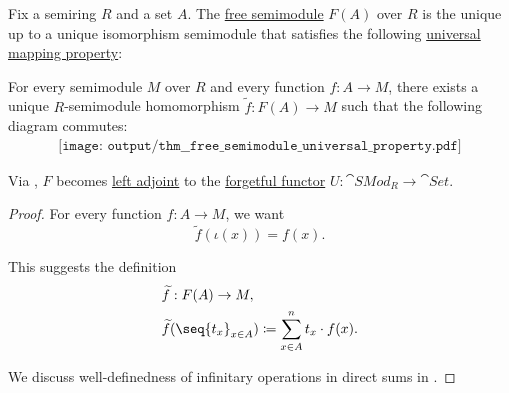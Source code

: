 \begin{proposition}\label{thm:free_semimodule_universal_property}
  Fix a semiring \( R \) and a set \( A \). The \hyperref[def:free_semimodule]{free semimodule} \( F(A) \) over \( R \) is the unique up to a unique isomorphism semimodule that satisfies the following \hyperref[rem:universal_mapping_property]{universal mapping property}:
  \begin{displayquote}
    For every semimodule \( M \) over \( R \) and every function \( f: A \to M \), there exists a unique \( R \)-semimodule homomorphism \( \widetilde{f}: F(A) \to M \) such that the following diagram commutes:
    \begin{equation}\label{eq:thm:free_semimodule_universal_property/diagram}
      \begin{aligned}
        \texttt{[image: output/thm\_\_free\_semimodule\_universal\_property.pdf]}
      \end{aligned}
    \end{equation}
  \end{displayquote}

  Via , \( F \) becomes \hyperref[def:category_adjunction]{left adjoint} to the \hyperref[def:concrete_category]{forgetful functor} \( U: \cat{SMod}_R \to \cat{Set} \).
\end{proposition}
\begin{proof}
  For every function \( f: A \to M \), we want
  \begin{equation*}
    \widetilde{f}(\iota(x)) = f(x).
  \end{equation*}

  This suggests the definition
  \begin{equation*}
    \begin{aligned}
      &\widetilde{f}: F(A) \to M, \\
      &\widetilde{f}(\seq{ t_x }_{x \in A}) \coloneqq \sum_{x \in A}^n t_x \cdot f(x).
    \end{aligned}
  \end{equation*}

  We discuss well-definedness of infinitary operations in direct sums in .
\end{proof}

